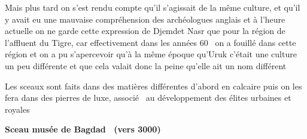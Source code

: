 \documentclass[a4paper]{article}
\begin{document}
{
Mais plus tard on s'est rendu compte qu'il s'agissait de la même
culture, et qu'il y avait eu une mauvaise compréhension des
archéologues anglais et à l'heure actuelle on ne garde cette expression
de Djemdet Nasr que pour la région de l'affluent du Tigre, car
effectivement dans les années 60 \ on a fouillé dans cette région et on
a pu s'apercevoir qu'à la même époque qu'Uruk c'était une culture un
peu différente et que cela valait donc la peine qu'elle ait un nom
différent}


\bigskip

{
Les sceaux sont faits dans des matières différentes d'abord en calcaire
puis on les fera dans des pierres de luxe, associé \ au développement
des élites urbaines et royales}


\bigskip


\bigskip


\bigskip


\bigskip


\bigskip


\bigskip


\bigskip


\bigskip


\bigskip


\bigskip


\bigskip


\bigskip


\bigskip


\bigskip


\bigskip


\bigskip


\bigskip


\bigskip


\bigskip


\bigskip


\bigskip


\bigskip


\bigskip


\bigskip


\bigskip


\bigskip


\bigskip


\bigskip

{
\textbf{Sceau musée de Bagdad \ (vers 3000)}}


\bigskip


\bigskip


\bigskip


\bigskip


\bigskip
\end{document}
